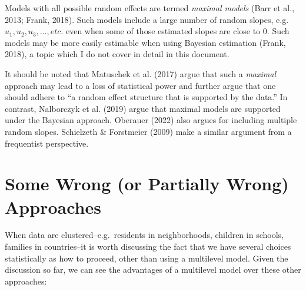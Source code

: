 \documentclass[
  letterpaper,
  DIV=11,
  numbers=noendperiod]{scrreprt}
\begin{document}
Models with all possible random effects are termed \emph{maximal models}
(Barr et al., 2013; Frank, 2018). Such models include a large number of
random slopes, e.g.~\(u_1, u_2, u_3, ..., etc.\) even when some of those
estimated slopes are close to 0. Such models may be more easily
estimable when using Bayesian estimation (Frank, 2018), a topic which I
do not cover in detail in this document.

It should be noted that Matuschek et al. (2017) argue that such a
\emph{maximal} approach may lead to a loss of statistical power and
further argue that one should adhere to ``a random effect structure that
is supported by the data.'' In contrast, Nalborczyk et al. (2019) argue
that maximal models are supported under the Bayesian approach. Oberauer
(2022) also argues for including multiple random slopes. Schielzeth \&
Forstmeier (2009) make a similar argument from a frequentist
perspective.

\hypertarget{sec-wrongapproaches}{%
\section{Some Wrong (or Partially Wrong)
Approaches}\label{sec-wrongapproaches}}

When data are clustered--e.g.~residents in neighborhoods, children in
schools, families in countries--it is worth discussing the fact that we
have several choices statistically as how to proceed, other than using a
multilevel model. Given the discussion so far, we can see the advantages
of a multilevel model over these other approaches:
\end{document}
